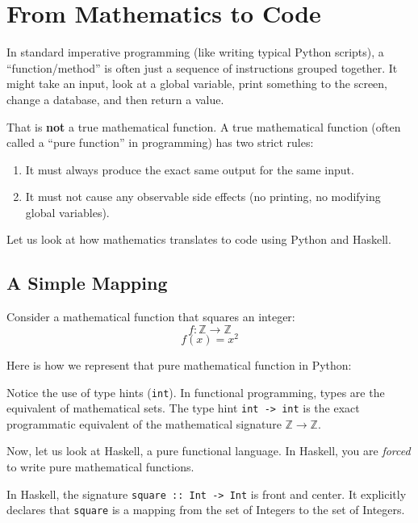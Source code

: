 \section{From Mathematics to Code}

In standard imperative programming (like writing typical Python scripts), a ``function/method'' is often just a sequence of instructions grouped together. It might take an input, look at a global variable, print something to the screen, change a database, and then return a value.

That is \textbf{not} a true mathematical function. A true mathematical function (often called a ``pure function'' in programming) has two strict rules:
\begin{enumerate}
    \item It must always produce the exact same output for the same input.
    \item It must not cause any observable side effects (no printing, no modifying global variables).
\end{enumerate}

Let us look at how mathematics translates to code using Python and Haskell.

\subsection{A Simple Mapping}

Consider a mathematical function that squares an integer:
\[ f : \mathbb{Z} \rightarrow \mathbb{Z} \]
\[ f(x) = x^2 \]

Here is how we represent that pure mathematical function in Python:



Notice the use of type hints (\texttt{int}). In functional programming, types are the equivalent of mathematical sets. The type hint \texttt{int -> int} is the exact programmatic equivalent of the mathematical signature $\mathbb{Z} \rightarrow \mathbb{Z}$.

Now, let us look at Haskell, a pure functional language. In Haskell, you are \textit{forced} to write pure mathematical functions.



In Haskell, the signature \texttt{square :: Int -> Int} is front and center. It explicitly declares that \texttt{square} is a mapping from the set of Integers to the set of Integers.

